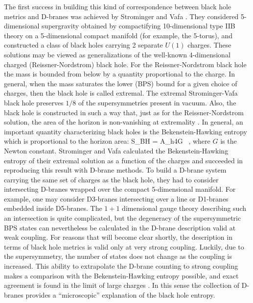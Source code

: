 \documentclass[12pt]{article}
\begin{document}
The first success in building this kind of correspondence between
black hole metrics and D-branes was achieved by Strominger and Vafa
\cite{SV}. They considered 5-dimensional
supergravity obtained by compactifying 10-dimensional type IIB theory
on a 5-dimensional compact manifold (for example, the 5-torus), 
and constructed a class of black holes carrying
2 separate $U(1)$ charges. These solutions may be viewed as generalizations
of the well-known 4-dimensional charged (Reissner-Nordstrom) black hole.
For the Reissner-Nordstrom black hole the mass
is bounded from below by a quantity proportional to the charge.
In general, when the mass saturates the lower (BPS)
bound for a given choice
of charges, then the black hole is called extremal.
The extremal Strominger-Vafa black hole
preserves $1/8$ of the supersymmetries present in vacuum.
Also, the black hole is constructed
in such a way that, just as for the Reissner-Nordstrom solution, 
the area of the
horizon is non-vanishing at extremality . 
In general, an important quantity characterizing
black holes is the Bekenstein-Hawking entropy which is proportional
to the horizon area:
\be S_{BH} = {A_h\over 4G}
\ ,
\ee
where $G$ is the Newton constant.
Strominger and Vafa calculated the Bekenstein-Hawking entropy of their
extremal solution as a function of the charges and succeeded in reproducing
this result with D-brane methods. To build a D-brane system carrying the 
same set of charges as the black hole, they had to consider intersecting
D-branes wrapped over the compact 5-dimensional manifold. 
For example, one may consider D3-branes intersecting over a line or
D1-branes embedded inside D5-branes. The $1+1$ dimensional gauge theory
describing such an intersection is quite complicated, but the degeneracy
of the supersymmetric BPS states can nevertheless be calculated in the
D-brane description valid at weak coupling. 
For reasons that will become clear shortly,
the description in terms of black hole metrics is valid only at very
strong coupling. Luckily, due to the supersymmetry,
the number of states does not change as the coupling is increased.
This ability to extrapolate the D-brane counting to strong coupling
makes a comparison with the Bekenstein-Hawking entropy possible,
and exact agreement is found in the limit of large charges \cite{SV}.
In this sense the collection of D-branes provides a ``microscopic''
explanation of the black hole entropy.
\end{document}

